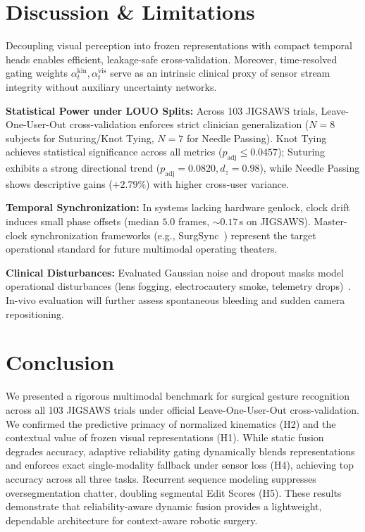 \documentclass[10pt,journal]{IEEEtran}
\begin{document}
\section{Discussion \& Limitations}
Decoupling visual perception into frozen representations with compact temporal heads enables efficient, leakage-safe cross-validation. Moreover, time-resolved gating weights $\alpha_t^{\text{kin}}, \alpha_t^{\text{vis}}$ serve as an intrinsic clinical proxy of sensor stream integrity without auxiliary uncertainty networks.

\textbf{Statistical Power under LOUO Splits:} Across 103 JIGSAWS trials, Leave-One-User-Out cross-validation enforces strict clinician generalization ($N=8$ subjects for Suturing/Knot Tying, $N=7$ for Needle Passing). Knot Tying achieves statistical significance across all metrics ($p_{\text{adj}} \le 0.0457$); Suturing exhibits a strong directional trend ($p_{\text{adj}}=0.0820, d_z=0.98$), while Needle Passing shows descriptive gains ($+2.79\%$) with higher cross-user variance.

\textbf{Temporal Synchronization:} In systems lacking hardware genlock, clock drift induces small phase offsets (median $5.0$ frames, $\sim 0.17$\,s on JIGSAWS). Master-clock synchronization frameworks (e.g., SurgSync~\cite{zhou2026surgsync}) represent the target operational standard for future multimodal operating theaters.

\textbf{Clinical Disturbances:} Evaluated Gaussian noise and dropout masks model operational disturbances (lens fogging, electrocautery smoke, telemetry drops)~\cite{rashid2025robustendoclip}. In-vivo evaluation will further assess spontaneous bleeding and sudden camera repositioning.

\section{Conclusion}
We presented a rigorous multimodal benchmark for surgical gesture recognition across all 103 JIGSAWS trials under official Leave-One-User-Out cross-validation. We confirmed the predictive primacy of normalized kinematics (H2) and the contextual value of frozen visual representations (H1). While static fusion degrades accuracy, adaptive reliability gating dynamically blends representations and enforces exact single-modality fallback under sensor loss (H4), achieving top accuracy across all three tasks. Recurrent sequence modeling suppresses oversegmentation chatter, doubling segmental Edit Scores (H5). These results demonstrate that reliability-aware dynamic fusion provides a lightweight, dependable architecture for context-aware robotic surgery.



\end{document}
